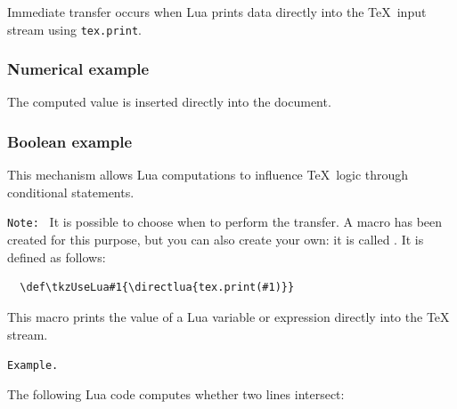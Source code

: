 Immediate transfer occurs when Lua prints data directly into the
\TeX\ input stream using \texttt{tex.print}.

\subsubsection*{Numerical example}

\begin{tkzexample}[latex=.5\textwidth]
\end{tkzexample}

The computed value is inserted directly into the document.

\subsubsection*{Boolean example}

\begin{tkzexample}[latex=.5\textwidth]

\end{tkzexample}

This mechanism allows Lua computations to influence
\TeX\ logic through conditional statements.

\medskip
\texttt{Note: } It is possible to choose when to perform the transfer. A macro has been created for this purpose, but you can also create your own: it is called . It is defined as follows:

\begin{mybox}
  \begin{verbatim}
  \def\tkzUseLua#1{\directlua{tex.print(#1)}}
\end{verbatim}
\end{mybox}

This macro prints the value of a Lua variable or expression directly into the TeX stream.

\medskip
\texttt{Example.}

 The following Lua code computes whether two lines intersect:


